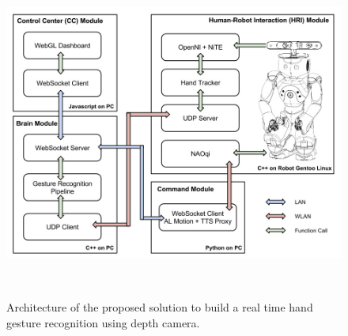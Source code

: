 \begin{figure}
	[h] \centering 
	\includegraphics[height=11cm]{figures/content/hri-architecture.jpg} \caption{Architecture of the proposed solution to build a real time hand gesture recognition using depth camera. } \label{fg:hri:architecture} 
\end{figure}
